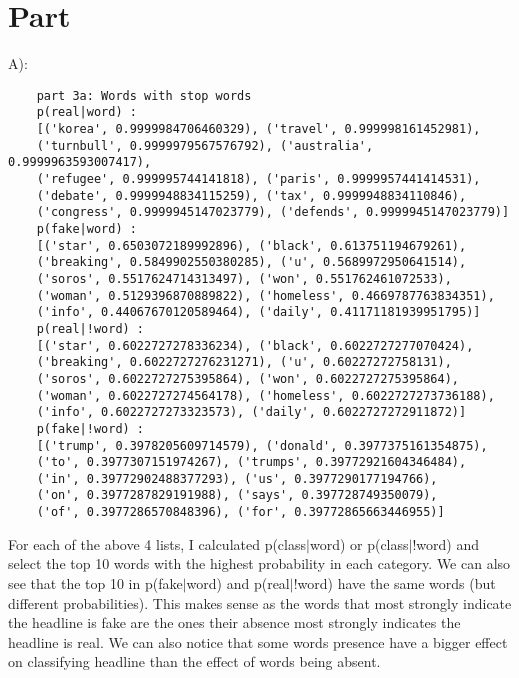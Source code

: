 \documentclass{article}
\newcommand{\enterProblemHeader}[1]{
}
\newcommand{\exitProblemHeader}[1]{
}
\newcounter{homeworkPartCounter} %
\newcommand{\homeworkPartName}{}
\newenvironment{homeworkPart}[1][Part \arabic{homeworkPartCounter}]{ %
\stepcounter{homeworkPartCounter} %
\renewcommand{\homeworkPartName}{#1} %
\section{\homeworkPartName} %
\enterProblemHeader{\homeworkPartName} %
}{
\exitProblemHeader{\homeworkPartName} %
}
\begin{document}
\begin{homeworkPart}

A):\\
\begin{verbatim}
    part 3a: Words with stop words
    p(real|word) :
    [('korea', 0.9999984706460329), ('travel', 0.999998161452981), 
    ('turnbull', 0.9999979567576792), ('australia', 0.9999963593007417), 
    ('refugee', 0.999995744141818), ('paris', 0.9999957441414531), 
    ('debate', 0.9999948834115259), ('tax', 0.9999948834110846), 
    ('congress', 0.9999945147023779), ('defends', 0.9999945147023779)]
    p(fake|word) :
    [('star', 0.6503072189992896), ('black', 0.613751194679261), 
    ('breaking', 0.5849902550380285), ('u', 0.5689972950641514), 
    ('soros', 0.5517624714313497), ('won', 0.551762461072533), 
    ('woman', 0.5129396870889822), ('homeless', 0.4669787763834351), 
    ('info', 0.44067670120589464), ('daily', 0.41171181939951795)]
    p(real|!word) :
    [('star', 0.6022727278336234), ('black', 0.6022727277070424), 
    ('breaking', 0.6022727276231271), ('u', 0.60227272758131), 
    ('soros', 0.6022727275395864), ('won', 0.6022727275395864), 
    ('woman', 0.6022727274564178), ('homeless', 0.6022727273736188), 
    ('info', 0.6022727273323573), ('daily', 0.6022727272911872)]
    p(fake|!word) :
    [('trump', 0.3978205609714579), ('donald', 0.3977375161354875), 
    ('to', 0.3977307151974267), ('trumps', 0.39772921604346484), 
    ('in', 0.39772902488377293), ('us', 0.3977290177194766), 
    ('on', 0.3977287829191988), ('says', 0.397728749350079), 
    ('of', 0.3977286570848396), ('for', 0.39772865663446955)]
\end{verbatim}
For each of the above 4 lists, I calculated p(class$|$word) or p(class$|$!word) and select the top 10 words with the highest probability in each category. We can also see that the top 10 in p(fake$|$word) and p(real$|$!word) have the same words (but different probabilities). This makes sense as the words that most strongly indicate the headline is fake are the ones their absence most strongly indicates the headline is real. We can also notice that some words presence have a bigger effect on classifying headline than the effect of words being absent.\\


\end{homeworkPart}
\end{document}
